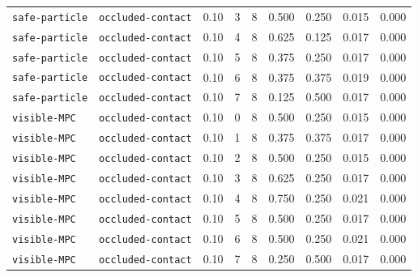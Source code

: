 \documentclass{article}
\begin{document}
\begin{center}
\begin{tabular}{llccccccc}
\texttt{safe-particle} & \texttt{occluded-contact} & 0.10 & 3 & 8 & 0.500 & 0.250 & 0.015 & 0.000 \\
\texttt{safe-particle} & \texttt{occluded-contact} & 0.10 & 4 & 8 & 0.625 & 0.125 & 0.017 & 0.000 \\
\texttt{safe-particle} & \texttt{occluded-contact} & 0.10 & 5 & 8 & 0.375 & 0.250 & 0.017 & 0.000 \\
\texttt{safe-particle} & \texttt{occluded-contact} & 0.10 & 6 & 8 & 0.375 & 0.375 & 0.019 & 0.000 \\
\texttt{safe-particle} & \texttt{occluded-contact} & 0.10 & 7 & 8 & 0.125 & 0.500 & 0.017 & 0.000 \\
\texttt{visible-MPC} & \texttt{occluded-contact} & 0.10 & 0 & 8 & 0.500 & 0.250 & 0.015 & 0.000 \\
\texttt{visible-MPC} & \texttt{occluded-contact} & 0.10 & 1 & 8 & 0.375 & 0.375 & 0.017 & 0.000 \\
\texttt{visible-MPC} & \texttt{occluded-contact} & 0.10 & 2 & 8 & 0.500 & 0.250 & 0.015 & 0.000 \\
\texttt{visible-MPC} & \texttt{occluded-contact} & 0.10 & 3 & 8 & 0.625 & 0.250 & 0.017 & 0.000 \\
\texttt{visible-MPC} & \texttt{occluded-contact} & 0.10 & 4 & 8 & 0.750 & 0.250 & 0.021 & 0.000 \\
\texttt{visible-MPC} & \texttt{occluded-contact} & 0.10 & 5 & 8 & 0.500 & 0.250 & 0.017 & 0.000 \\
\texttt{visible-MPC} & \texttt{occluded-contact} & 0.10 & 6 & 8 & 0.500 & 0.250 & 0.021 & 0.000 \\
\texttt{visible-MPC} & \texttt{occluded-contact} & 0.10 & 7 & 8 & 0.250 & 0.500 & 0.017 & 0.000 \\
\bottomrule
\end{tabular}
\end{center}
\end{document}
